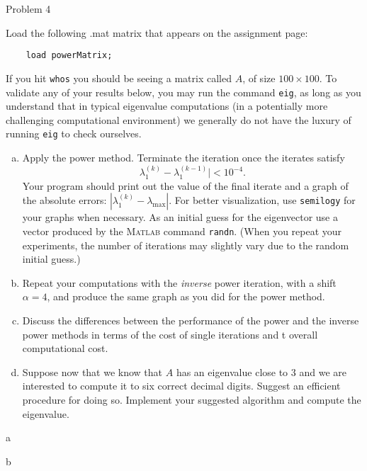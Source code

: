 \begin{section}{Problem 4}
    \begin{problem}{4}
        Load the following .mat matrix that appears on the assignment page:
        \begin{verbatim}
    load powerMatrix;
        \end{verbatim}
        If you hit {\tt whos} you should be seeing a matrix called $A$, of size $100 \times 100$. To validate any of your results below, you may run the {} command {\tt eig}, as long as you understand that in typical eigenvalue computations (in a potentially more challenging computational environment) we generally do not have the luxury of running  {\tt eig} to check ourselves. 
        \begin{enumerate}[(a)]
            \item Apply the power method. Terminate the iteration once the iterates satisfy $$ \lambda_1^{(k)}-\lambda_1^{(k-1)}| < 10^{-4}.$$ Your program should print out the value of the final iterate and a graph of the absolute errors: $| \lambda_1^{(k)}-\lambda_{\max}|$. For better visualization, use {\tt semilogy}  for your graphs when necessary. As an initial guess for the eigenvector use a vector produced by the \textsc{Matlab} command {\tt randn}. (When you repeat your experiments, the number of iterations may slightly vary due to the random initial guess.)
            \item Repeat your computations with the {\em inverse} power iteration, with a shift $\alpha=4$, and produce the same graph as you did for the power method.
            \item Discuss the differences between the performance of the power and the inverse power methods in terms of the cost of single iterations and t overall computational cost.
            \item Suppose now that we know that $A$ has an eigenvalue close to 3 and we are interested to compute it to six correct decimal digits. Suggest an efficient procedure for doing so. Implement your suggested algorithm and compute the eigenvalue.
        \end{enumerate}
    \end{problem}

    \begin{solution}{a}
    \end{solution}

    \newpage
    
    \begin{solution}{b}
    \end{solution}
\end{section}
